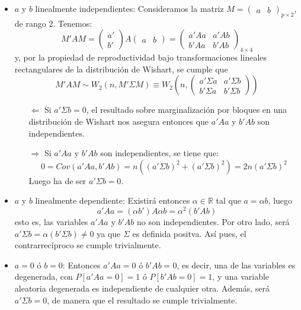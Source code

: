 \documentclass[11pt,a4paper]{article}
\begin{document}
\begin{enumerate}[label=\arabic*.]
\begin{itemize}
\item $a$ y $b$ linealmente independientes: Consideramos la matriz $M = \begin{pmatrix} a & b \end{pmatrix}_{p \times 2}$, de rango 2. Tenemos:
$$M'AM = \begin{pmatrix} a' \\ b' \end{pmatrix} A \begin{pmatrix} a & b \end{pmatrix} = \begin{pmatrix}
a'Aa & a'Ab \\
b'Aa & b'Ab
\end{pmatrix}_{4 \times 4}$$
y, por la propiedad de reproductividad bajo transformaciones lineales rectangulares de la distribución de Wishart, se cumple que
$$M'AM \sim W_{2}(n, M'\Sigma M) \equiv W_{2}(n, \begin{pmatrix}
a' \Sigma a & a' \Sigma b \\
b' \Sigma a & b' \Sigma b
\end{pmatrix})$$

\begin{itemize}
\item[$\Leftarrow$] Si $a' \Sigma b = 0$, el resultado sobre marginalización por bloques en una distribución de Wishart nos asegura entonces que $a'Aa$ y $b'Ab$ son independientes.

\item[$\Rightarrow$] Si $a'Aa$ y $b'Ab$ son independientes, se tiene que:
$$0 = Cov(a'Aa, b'Ab) = n((a' \Sigma b)^{2} + (a' \Sigma b)^{2}) = 2n(a' \Sigma b)^{2}$$
Luego ha de ser $a' \Sigma b = 0$.
\end{itemize}

\item $a$ y $b$ linealmente dependiente: Existirá entonces $\alpha \in \mathbb{R}$ tal que $a = \alpha b$, luego
$$a'Aa = (\alpha b') A \alpha b = \alpha^{2} (b' A b)$$
esto es, las variables $a'Aa$ y $b'Ab$ no son independientes. Por otro lado, será $a' \Sigma b = \alpha (b' \Sigma b) \neq 0$ ya que $\Sigma$ es definida positva. Así pues, el contrarrecíproco se cumple trivialmente.

\item $a = 0$ ó $b = 0$: Entonces $a'Aa = 0$ ó $b'Ab = 0$, es decir, una de las variables es degenerada, con $P[a'Aa=0]=1$ ó $P[b'Ab=0]=1$, y una variable aleatoria degenerada es independiente de cualquier otra. Además, será $a' \Sigma b = 0$, de manera que el resultado se cumple trivialmente.
\end{itemize}


\end{enumerate}
\end{document}
